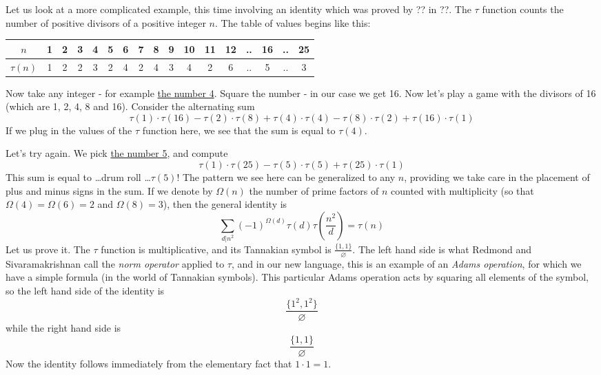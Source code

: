 \documentclass[a4paper]{article}
\begin{document}
\begin{example}
Let us look at a more complicated example, this time involving an identity which was proved by ?? in ??. The $\tau$ function counts the number of positive divisors of a positive integer $n$. The table of values begins like this:

\vspace{6pt}
\begin{tabular}{  | c || c | c | c | c | c | c | c | c | c | c | c | c | c | c | c | c |  }
  \hline			
  $n$ & 1 & 2 & 3 & 4 & 5 & 6 & 7 & 8 & 9 & 10 & 11 & 12 & .. & 16 & .. & 25  \\
  \hline
  $\tau(n) $ & 1 & 2 & 2 & 3 & 2 & 4 & 2 & 4 & 3 & 4 & 2 & 6 & .. & 5 & .. & 3  \\
  \hline  
\end{tabular}
\vspace{6pt}

Now take any integer - for example \underline{the number 4}. Square the number - in our case we get 16. Now let's play a game with the divisors of 16 (which are 1, 2, 4, 8 and 16). Consider the alternating sum
$$    \tau(1) \cdot \tau(16) -  \tau(2) \cdot \tau(8) + \tau(4) \cdot \tau(4) - \tau(8) \cdot \tau(2) + \tau(16) \cdot \tau(1)  $$
If we plug in the values of the $\tau$ function here, we see that the sum is equal to $\tau(4)$.

Let's try again. We pick \underline{the number 5}, and compute
$$    \tau(1) \cdot \tau(25) -  \tau(5) \cdot \tau(5) + \tau(25) \cdot \tau(1) $$
This sum is equal to \ldots drum roll \ldots $\tau(5)$!
The pattern we see here can be generalized to any $n$, providing we take care in the placement of plus and minus signs in the sum. If we denote by $\Omega(n)$ the number of prime factors of $n$ counted with multiplicity (so that $\Omega(4) = \Omega(6) = 2$ and $\Omega(8) = 3$), then the general identity is
\begin{equation} \label{introexample2}
\sum_{d \vert n^2} (-1)^{\Omega(d)} \tau(d) \tau(\frac{n^2}{d}) = \tau(n)  
\end{equation}
Let us prove it. The $\tau$ function is multiplicative, and its Tannakian symbol is $\frac{ \{ 1 ,1 \} }{ \varnothing }$. The left hand side is what Redmond and Sivaramakrishnan \cite{} call the \emph{norm operator} applied to $\tau$, and in our new language, this is an example of an \emph{Adams operation}, for which we have a simple formula (in the world of Tannakian symbols). This particular Adams operation acts by squaring all elements of the symbol, so the left hand side of the identity is 
$$\frac{ \{ 1^2, 1^2  \} }{ \varnothing  }$$
while the right hand side is 
$$ \frac{ \{ 1, 1  \} }{ \varnothing  } $$
Now the identity follows immediately from the elementary fact that $1 \cdot 1 = 1$. 
\end{example}
\end{document}
